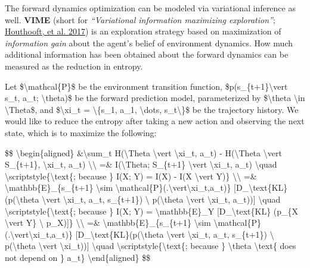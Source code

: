 The forward dynamics optimization can be modeled via variational inference as well. \textbf{VIME} (short for \emph{``Variational information maximizing exploration''}; \href{https://arxiv.org/abs/1605.09674}{Houthooft, et al. 2017}) is an exploration strategy based on maximization of \emph{information gain} about the agent's belief of environment dynamics. How much additional information has been obtained about the forward dynamics can be measured as the reduction in entropy.

Let \$\textbackslash mathcal\{P\}\$ be the environment transition function, \$p(s\_\{t+1\}\textbackslash vert s\_t, a\_t; \textbackslash theta)\$ be the forward prediction model, parameterized by \$\textbackslash theta \textbackslash in \textbackslash Theta\$, and \$\textbackslash xi\_t = \textbackslash\{s\_1, a\_1, \textbackslash dots, s\_t\textbackslash\}\$ be the trajectory history. We would like to reduce the entropy after taking a new action and observing the next state, which is to maximize the following:

\$\$ \textbackslash begin\{aligned\} \&\textbackslash sum\_t H(\textbackslash Theta \textbackslash vert \textbackslash xi\_t, a\_t) - H(\textbackslash Theta \textbackslash vert S\_\{t+1\}, \textbackslash xi\_t, a\_t) \textbackslash\textbackslash{} =\& I(\textbackslash Theta; S\_\{t+1\} \textbackslash vert \textbackslash xi\_t, a\_t) \textbackslash quad \textbackslash scriptstyle\{\textbackslash text\{; because \} I(X; Y) = I(X) - I(X \textbackslash vert Y)\} \textbackslash\textbackslash{} =\& \textbackslash mathbb\{E\}\_\{s\_\{t+1\} \textbackslash sim \textbackslash mathcal\{P\}(.\textbackslash vert\textbackslash xi\_t,a\_t)\} {[}D\_\textbackslash text\{KL\}(p(\textbackslash theta \textbackslash vert \textbackslash xi\_t, a\_t, s\_\{t+1\}) \textbackslash\textbar{} p(\textbackslash theta \textbackslash vert \textbackslash xi\_t, a\_t)){]} \textbackslash quad \textbackslash scriptstyle\{\textbackslash text\{; because \} I(X; Y) = \textbackslash mathbb\{E\}\_Y {[}D\_\textbackslash text\{KL\} (p\_\{X \textbackslash vert Y\} \textbackslash\textbar{} p\_X){]}\} \textbackslash\textbackslash{} =\& \textbackslash mathbb\{E\}\_\{s\_\{t+1\} \textbackslash sim \textbackslash mathcal\{P\}(.\textbackslash vert\textbackslash xi\_t,a\_t)\} {[}D\_\textbackslash text\{KL\}(p(\textbackslash theta \textbackslash vert \textbackslash xi\_t, a\_t, s\_\{t+1\}) \textbackslash\textbar{} p(\textbackslash theta \textbackslash vert \textbackslash xi\_t)){]} \textbackslash quad \textbackslash scriptstyle\{\textbackslash text\{; because \} \textbackslash theta \textbackslash text\{ does not depend on \} a\_t\} \textbackslash end\{aligned\} \$\$


